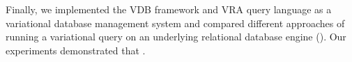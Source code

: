 Finally, we implemented the VDB framework and VRA query language as
a variational database management system and compared different approaches
of running a variational query on an underlying relational database engine 
(). Our experiments demonstrated that . 



